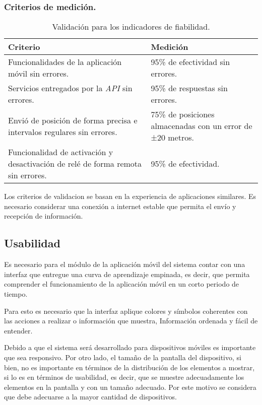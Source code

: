 \subsubsection{Criterios de medición.}

\begin{table}[H]
    \caption[Validación para los indicadores de fiabilidad.] {Validación para los indicadores de fiabilidad.}
    \label{tbl:Criterios de Validación fiabilidad}
    \begin{tabular}{|p{}|p{}|}
        \hline
        \textbf{Criterio} &  \textbf{Medición}\\
    	\hline
    	\hline
    	Funcionalidades de la aplicación móvil sin errores. & 95\% de efectividad sin errores. \\ \hline
		Servicios entregados por la \emph{API} sin errores. & 95\% de respuestas sin errores. \\ \hline
		Envió de posición de forma precisa e intervalos regulares sin errores. & 75\% de posiciones almacenadas con un error de ±20 metros. \\ \hline
		Funcionalidad de activación y desactivación de relé de forma remota sin errores. & 95\% de efectividad. \\
        \hline
    \end{tabular}
\end{table}

Los criterios de validacion se basan en la experiencia de aplicaciones similares. Es necesario considerar una conexión a internet estable que permita el envío y recepción de información.

\subsection{Usabilidad}

Es necesario para el módulo de la aplicación móvil del sistema contar con una interfaz que entregue una curva de aprendizaje empinada, es decir, que permita comprender el funcionamiento de la aplicación móvil en un corto periodo de tiempo.

Para esto es necesario que la interfaz aplique colores y símbolos coherentes con las acciones a realizar o información que muestra, Información ordenada y fácil de entender.

Debido a que el sistema será desarrollado para dispositivos móviles es importante que sea responsivo. Por otro lado, el tamaño de la pantalla del dispositivo, si bien, no es importante en términos de la distribución de los elementos a mostrar, si lo es en términos de usabilidad, es decir, que se muestre adecuadamente los elementos en la pantalla y con un tamaño adecuado. Por este motivo se considera que debe adecuarse a la mayor cantidad de dispositivos.


